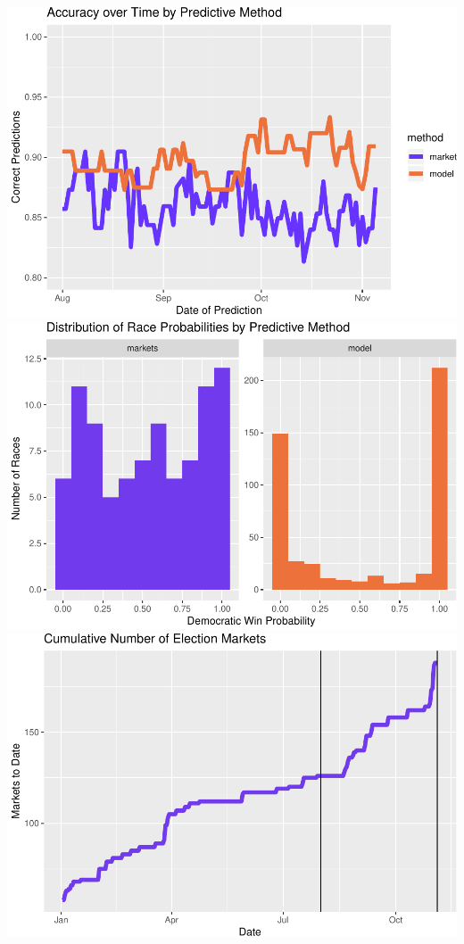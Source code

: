 \documentclass[]{article}
\begin{document}
\includegraphics{progress_report_files/figure-latex/print_plots-1.pdf}
\includegraphics{progress_report_files/figure-latex/print_plots-2.pdf}
\includegraphics{progress_report_files/figure-latex/print_plots-3.pdf}
\end{document}
